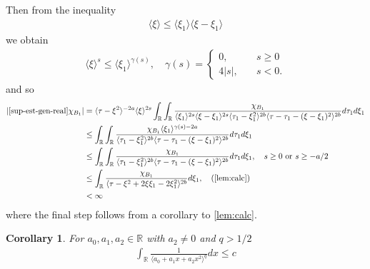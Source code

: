\documentclass[12pt,reqno]{amsart}
\numberwithin{equation}{section}  %
\numberwithin{figure}{section}
\newcommand{\rr}{\mathbb{R}}
\theoremstyle{plain}
\newtheorem{corollary}{Corollary}
\theoremstyle{definition}
\theoremstyle{remark}
\begin{document}
%
Then from the inequality
%
%
\begin{equation*}
\begin{split}
  \langle \xi \rangle  \le \langle \xi_{1} \rangle \langle \xi - \xi_{1} \rangle 
\end{split}
\end{equation*}
%
we obtain
%
%
\begin{equation*}
\begin{split}
  \langle \xi \rangle ^{s} \le \langle \xi_{1} \rangle ^{\gamma(s)},
  \quad 
  \gamma(s) = 
  \begin{cases} 0, \quad & s \ge 0
    \\
    4|s|, \quad & s < 0.
  \end{cases}
\end{split}
\end{equation*}
%
%
%
%
%
and so
%
%
\begin{equation}
\begin{split}
  |  \eqref{sup-est-gen-real} \chi_{B_{1}}|
  & =  \langle \tau - \xi^{2} \rangle
  ^{-2a} \langle \xi \rangle ^{2s} \int _{\rr} \int_{\rr} \frac{\chi_{B_{1}}}{
  \langle \xi_{1} \rangle ^{2s} \langle \xi-\xi_{1}\rangle ^{2s} \langle \tau_{1} - \xi_{1}^{2} \rangle ^{2b}\langle
  \tau - \tau_{1} - (\xi -\xi_{1})^{2}\rangle ^{2b}}d \tau_{1} d \xi_{1} 
  \\
  & \le  \int_{\rr} \int_{\rr} \frac{\chi_{B_{1}}
  \langle
  \xi_{1}\rangle ^{\gamma(s) -2a} 
}{ \langle \tau_{1} - \xi_{1}^{2} \rangle ^{2b}\langle
  \tau - \tau_{1} - (\xi - \xi_{1})^{2}\rangle ^{2b}}
  d \tau_{1} d \xi_{1} 
  \\
  & \le \int_{\rr} \int_{\rr} \frac{\chi_{B_{1}}
  }{ \langle \tau_{1} - \xi_{1}^{2} \rangle ^{2b}\langle
  \tau - \tau_{1} - (\xi - \xi_{1})^{2}\rangle ^{2b}}
  d \tau_{1} d \xi_{1}, \quad s \ge 0 \text{ or } s \ge -a/2
  \\
  & \le \int _{\rr} 
  \frac{\chi_{B_{1}}}{\langle \tau - \xi^{2} + 2 \xi
  \xi_{1} - 2 \xi_{1}^{2} \rangle ^{2b}}d \xi_{1}, \quad (\autoref{lem:calc}) 
  \\
  & < \infty
\end{split}
\end{equation}
%
where the final step follows from a corollary to \autoref{lem:calc}.
%
%
%
%
%
%
%
%
\begin{corollary}
  For $a_{0}, a_{1}, a_{2} \in \rr$ with $a_{2} \neq 0$ and $q > 1/2$
  \begin{equation*}
  \begin{split}
    \int_{\rr} \frac{1}{\langle a_{0} + a_{1}x + a_{2}x^{2} \rangle ^{q}} dx \le c
  \end{split}
  \end{equation*}
\label{cor:integral-bound}
\end{corollary}
\end{document}
